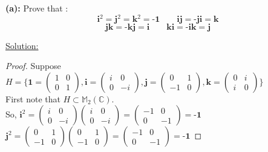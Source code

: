\documentclass{article} %
\begin{document}
\textbf{(a):} Prove that :
\[ \textbf{i$^2$}  = \textbf{j$^2$} = \textbf{k$^2$} = \textbf{-1} \qquad \textbf{ij} = \textbf{-ji} = \textbf{k} \]
\[ \textbf{jk} = \textbf{-kj} = \textbf{i} \qquad \textbf{ki} = \textbf{-ik} = \textbf{j}\]
\begin{addmargin}[1em]{0em}
\underline{Solution: }
\begin{addmargin}[1em]{0em}
\begin{proof}
Suppose $H = \{\textbf{1} = \left( \begin{matrix} 1 & 0 \\ 0 & 1 \end{matrix} \right),
                          \textbf{i} = \left( \begin{matrix} i & 0 \\ 0 & -i \end{matrix} \right),
                           \textbf{j} = \left( \begin{matrix} 0 & 1 \\ -1 & 0 \end{matrix} \right),
                            \textbf{k} = \left( \begin{matrix} 0 & i \\ i & 0 \end{matrix} \right) \}$
\\First note that $H \subset \mathbb{M}_2(\mathbb{C})$.
\\So, $\textbf{i}^2 =  \left( \begin{matrix} i & 0 \\ 0 & -i \end{matrix} \right)\left( \begin{matrix} i & 0 \\ 0 & -i \end{matrix} \right)  = \left( \begin{matrix} -1 & 0 \\ 0 & -1 \end{matrix} \right) = \textbf{-1}$
\\ $\textbf{j}^2 = \left( \begin{matrix} 0 & 1 \\ -1 & 0 \end{matrix} \right)\left( \begin{matrix} 0 & 1 \\ -1 & 0 \end{matrix} \right) = \left( \begin{matrix} -1 & 0 \\ 0 & -1 \end{matrix} \right) = \textbf{-1}$

\end{proof}
\end{addmargin}
\end{addmargin}
\end{document}

